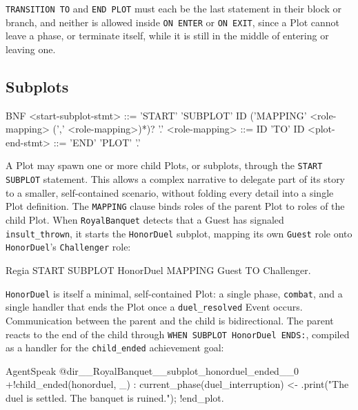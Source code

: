 \lstinline|TRANSITION TO| and \lstinline|END PLOT| must each be the last statement in their block or branch, and neither is allowed inside \lstinline|ON ENTER| or \lstinline|ON EXIT|, since a Plot cannot leave a phase, or terminate itself, while it is still in the middle of entering or leaving one.

\subsection{Subplots}
\label{sec:subplots}

\begin{codeblock}[]{BNF}
    <start-subplot-stmt>     ::= 'START' 'SUBPLOT' ID ('MAPPING' <role-mapping> (',' <role-mapping>)*)? '.'
    <role-mapping>           ::= ID 'TO' ID
    <plot-end-stmt>          ::= 'END' 'PLOT' '.'
\end{codeblock}

A Plot may spawn one or more child Plots, or subplots, through the \lstinline|START SUBPLOT| statement. This allows a complex narrative to delegate part of its story to a smaller, self-contained scenario, without folding every detail into a single Plot definition. The \lstinline|MAPPING| clause binds roles of the parent Plot to roles of the child Plot. When \lstinline|RoyalBanquet| detects that a Guest has signaled \lstinline|insult_thrown|, it starts the \lstinline|HonorDuel| subplot, mapping its own \lstinline|Guest| role onto \lstinline|HonorDuel|'s \lstinline|Challenger| role:

\begin{codeblock}[]{Regia}
START SUBPLOT HonorDuel MAPPING Guest TO Challenger.
\end{codeblock}

\lstinline|HonorDuel| is itself a minimal, self-contained Plot: a single phase, \lstinline|combat|, and a single handler that ends the Plot once a \lstinline|duel_resolved| Event occurs. Communication between the parent and the child is bidirectional. The parent reacts to the end of the child through \lstinline|WHEN SUBPLOT HonorDuel ENDS:|, compiled as a handler for the \lstinline|child_ended| achievement goal:

\begin{codeblock}[]{AgentSpeak}
@dir__RoyalBanquet__subplot_honorduel_ended__0
+!child_ended(honorduel, _) : current_phase(duel_interruption) <-
    .print("The duel is settled. The banquet is ruined.");
    !end_plot.
\end{codeblock}

